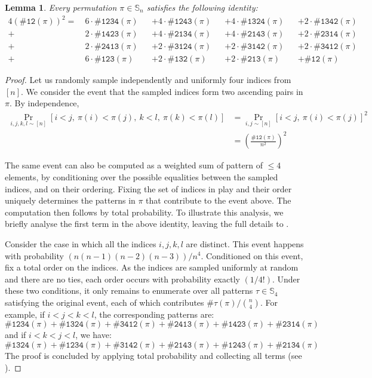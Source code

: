 \documentclass{article}
\newtheorem{lemma}[theorem]{Lemma}
\newcommand{\Sn}{\mathbb{S}_n}
\newcommand{\pc}[2]{{\# \mathtt{ #1 } \left( #2 \right)}}
\theoremstyle{remark}
\theoremstyle{plain}
\begin{document}
\begin{lemma}
    \label{lemma:relation_2_3_4_profile}
    Every permutation $\pi \in \Sn$ satisfies the following identity: 
    \begin{alignat*}{4}
        \left( \pc{12}{\pi} \right)^2 =\ &6 \cdot \pc{1234}{\pi} &&+ 4 \cdot \pc{1243}{\pi} &&+ 4 \cdot \pc{1324}{\pi} &&+ 2 \cdot \pc{1342}{\pi} \\
        +\ &2 \cdot \pc{1423}{\pi} &&+ 4 \cdot \pc{2134}{\pi} &&+ 4 \cdot \pc{2143}{\pi} &&+ 2 \cdot \pc{2314}{\pi} \\
        +\ &2 \cdot \pc{2413}{\pi} &&+ 2 \cdot \pc{3124}{\pi} &&+ 2 \cdot \pc{3142}{\pi} &&+ 2 \cdot \pc{3412}{\pi} \\
        +\ &6 \cdot \pc{123}{\pi} &&+ 2 \cdot \pc{132}{\pi} &&+ 2 \cdot \pc{213}{\pi} &&+ \pc{12}{\pi}
    \end{alignat*}
\end{lemma}
\begin{proof}
    Let us randomly sample independently and uniformly four indices from $[n]$. We consider the event that the sampled indices form two ascending pairs in $\pi$. By independence, 
    \begin{align*}
        \Pr_{i,j,k,l \sim [n]} \left[ i < j,\ \pi(i) < \pi(j),\ k < l,\ \pi(k) < \pi(l) \right] &= \Pr_{i,j \sim [n]} \left[ i < j,\ \pi(i) < \pi(j) \right]^2 \\
        &= \left( \frac{\pc{12}{\pi}}{n^2} \right)^2 
    \end{align*}
    
    The same event can also be computed as a weighted sum of pattern
    of $\le 4$ elements, by conditioning over the possible equalities between the sampled indices, and on their ordering. Fixing the set of indices in play and their order uniquely determines the patterns in $\pi$ that
    contribute to the event above. The computation then follows by total probability. To illustrate this analysis, we briefly analyse the first term in the above identity, leaving the full details to .
    
    Consider the case in which all the indices $i,j,k,l$ are distinct. This event happens with probability $\left(n(n-1)(n-2)(n-3) \right)/n^4$. Conditioned on this event, fix a total order on the indices. As the indices are sampled uniformly at random and there are no ties, each  order occurs with probability exactly $(1/4!)$. Under these two conditions, it only remains to enumerate over all patterns $\tau \in \mathbb{S}_4$ satisfying the original event, each of which contributes $\pc{\tau}{\pi}/\binom{n}{4}$. For example, if $i < j < k < l$, the corresponding patterns are:
    \[
        \pc{1234}{\pi} + \pc{1324}{\pi} + \pc{3412}{\pi} + \pc{2413}{\pi} + \pc{1423}{\pi} + \pc{2314}{\pi}
    \]
    and if $i < k < j < l$, we have:
    \[
        \pc{1324}{\pi} + \pc{1234}{\pi} + \pc{3142}{\pi} + \pc{2143}{\pi} + \pc{1243}{\pi} + \pc{2134}{\pi}
    \]
    The proof is concluded by applying total probability and collecting all terms (see  ). 
\end{proof}
\end{document}
